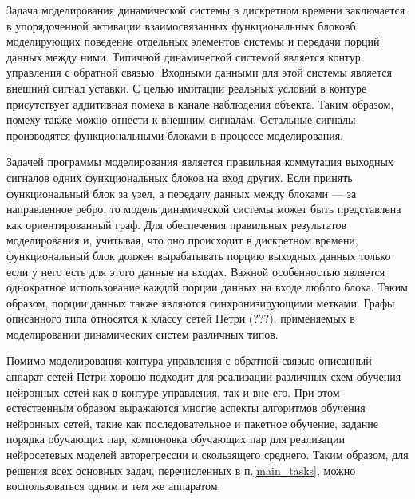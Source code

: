 
Задача моделирования динамической системы в дискретном времени
заключается в упорядоченной активации взаимосвязанных функциональных
блоковб моделирующих поведение отдельных элементов системы и передачи
порций данных между ними.  Типичной динамической системой является
контур управления с обратной связью.  Входными данными для этой
системы является внешний сигнал уставки.  С целью имитации реальных
условий в контуре присутствует аддитивная помеха в канале наблюдения
объекта.  Таким образом, помеху также можно отнести к внешним
сигналам.  Остальные сигналы производятся функциональными блоками в
процессе моделирования.

Задачей программы моделирования является правильная коммутация
выходных сигналов одних функциональных блоков на вход других.  Если
принять функциональный блок за узел, а передачу данных между блоками
--- за направленное ребро, то модель динамической системы может быть
представлена как ориентированный граф.  Для обеспечения правильных
результатов моделирования и, учитывая, что оно происходит в дискретном
времени, функциональный блок должен вырабатывать порцию выходных
данных только если у него есть для этого данные на входах.  Важной
особенностью является однократное использование каждой порции данных
на входе любого блока.  Таким образом, порции данных также являются
синхронизирующими метками.  Графы описанного типа относятся к классу
сетей Петри (???), применяемых в моделировании динамических систем
различных типов.

Помимо моделирования контура управления с обратной связью описанный
аппарат сетей Петри хорошо подходит для реализации различных схем
обучения нейронных сетей как в контуре управления, так и вне его.  При
этом естественным образом выражаются многие аспекты алгоритмов
обучения нейронных сетей, такие как последовательное и пакетное
обучение, задание порядка обучающих пар, компоновка обучающих пар для
реализации нейросетевых моделей авторегрессии и скользящего среднего.
Таким образом, для решения всех основных задач, перечисленных в
п.\ref{main_tasks}, можно воспользоваться одним и тем же аппаратом.

